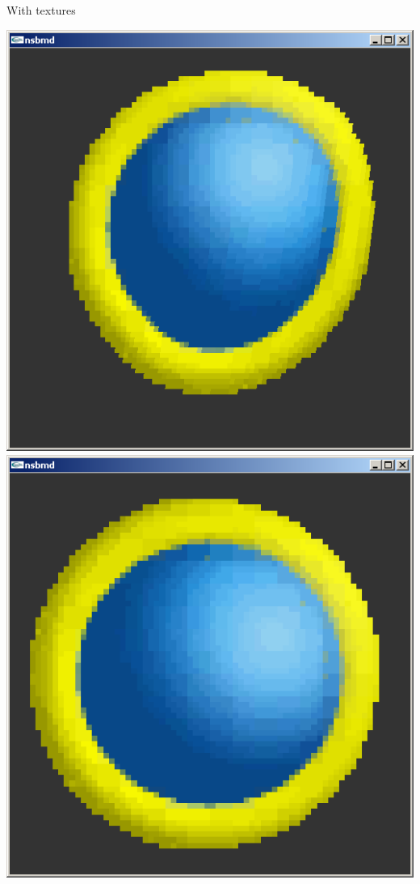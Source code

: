 \documentclass[
]{book}
\begin{document}
With textures

\includegraphics{images/67_home_fast6191_romhackingguide_unrenamed_file____romhackingguidegraphics3dminorNSMBDmodel_3.png}\includegraphics{images/68_home_fast6191_romhackingguide_unrenamed_file____romhackingguidegraphics3dminorNSMBDmodel_4.png}
\end{document}
